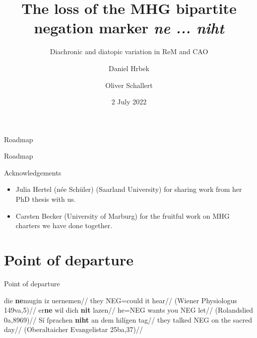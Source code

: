 \documentclass[xcolor=table, compress, %
handout
]{beamer}
\title[Loss of the MHG bipartite negation marker \textit{ne ... niht}]{\bf{The loss of the MHG bipartite negation marker \textit{ne ... niht}}}
\subtitle{Diachronic and diatopic variation in ReM and CAO}
\author[Daniel Hrbek and Oliver Schallert]{%
Daniel Hrbek\inst{1} \and Oliver Schallert\inst{2}}
\institute{%
\inst{1} Osnabrück University %

\href{mailto:daniel.hrbek@uni-osnabrueck.de}{\texttt{daniel.hrbek@uni-osnabrueck.de}}
\and
\inst{2} Ludwig Maximilian University of Munich %

\href{mailto:oliver.schallert@lmu.de}{\texttt{oliver.schallert@lmu.de}}
}
\date{2 July 2022}
\begin{document}
\begin{frame}
\thispagestyle{empty}
\titlepage
\end{frame}



\begin{frame}{Roadmap}

\tableofcontents[sections={1-2}]

\end{frame}

\begin{frame}{Roadmap}

\tableofcontents[sections={3-5}]


\end{frame}

\begin{frame}{Acknowledgements}

\begin{itemize}
\item \alert{Julia Hertel} (née Schüler) (Saarland University) for sharing work from her PhD thesis with us.
\item \alert{Carsten Becker} (University of Marburg) for the fruitful work on MHG charters we have done together.
\end{itemize}

\end{frame}


\section{Point of departure}

\begin{frame}{Point of departure}

\pex[] \label{a}
\a
\begingl
\gla die \textbf{ne}mugin iz uernemen//
\glb they NEG=could it hear//
\glft (Wiener Physiologus 149va,5)//
\endgl
\a
\begingl
\gla er\textbf{ne} wil dich \textbf{nit} lazen//
\glb he=NEG wants you NEG let//
\glft (Rolandslied 0a,8969)//
\endgl
\a
\begingl
\gla Sí	ſprachen \textbf{niht} an dem hilígen tag//
\glb they talked NEG on the sacred day//
\glft  (Oberaltaicher Evangelistar 25ba,37)//
\endgl
\xe

\end{frame}
\end{document}
